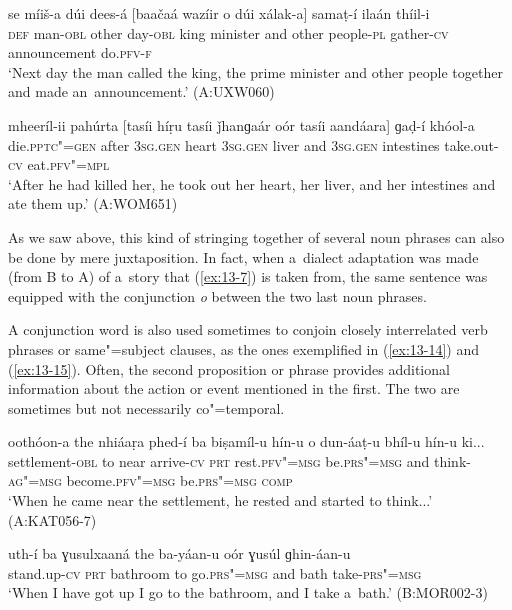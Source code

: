 \begin{exe}
\ex
\label{ex:13-12}
\gll se míiš-a dúi dees-á [baačaá wazíir o dúi xálak-a] samaṭ-í ilaán thíil-i \\
\textsc{def} man-\textsc{obl} other day-\textsc{obl} king minister and other  people-\textsc{pl} gather-\textsc{cv} announcement do.\textsc{pfv-f}  \\
\glt `Next day the man called the king, the prime minister and other people together and made an~announcement.' (A:UXW060)

\ex
\label{ex:13-13}
\gll mheeríl-ii pahúrta [tasíi híṛu tasíi ǰhanɡaár oór tasíi aandáara] ɡaḍ-í khóol-a  \\
die.\textsc{pptc"=gen} after \textsc{3sg.gen} heart \textsc{3sg.gen}  liver and \textsc{3sg.gen} intestines take.out-\textsc{cv} eat.\textsc{pfv"=mpl}\\
\glt `After he had killed her, he took out her heart, her liver, and her intestines and ate them up.' (A:WOM651) 
\end{exe}

As we saw above, this kind of stringing together of several noun phrases can also be done by mere juxtaposition. In fact, when a~dialect adaptation was made (from B to A) of a~story that (\ref{ex:13-7}) is taken from, the same sentence was equipped with the conjunction \textit{o} between the two last noun phrases. 


A conjunction word is also used sometimes to conjoin closely interrelated verb phrases or same"=subject clauses, as the ones exemplified in (\ref{ex:13-14}) and (\ref{ex:13-15}). Often, the second proposition or phrase provides additional information about the action or event mentioned in the first. The two are sometimes but not necessarily co"=temporal.

\begin{exe}
\ex
\label{ex:13-14}
\gll oothóon-a the nhiáaṛa phed-í ba biṣamíl-u hín-u o dun-áaṭ-u bhíl-u hín-u ki...\\
settlement-\textsc{obl} to near arrive-\textsc{cv} \textsc{prt} rest.\textsc{pfv"=msg} be.\textsc{prs"=msg} and think-\textsc{ag"=msg} become.\textsc{pfv"=msg} be.\textsc{prs"=msg } \textsc{comp} \\
\glt `When he came near the settlement, he rested and started to think...' (A:KAT056-7)

\ex
\label{ex:13-15}
\gll uth-í ba ɣusulxaaná the ba-yáan-u oór ɣusúl ɡhin-áan-u \\
stand.up-\textsc{cv} \textsc{prt} bathroom to go.\textsc{prs"=msg}  and bath take-\textsc{prs"=msg} \\
\glt `When I have got up I go to the bathroom, and I take a~bath.' (B:MOR002-3) 
\end{exe}

